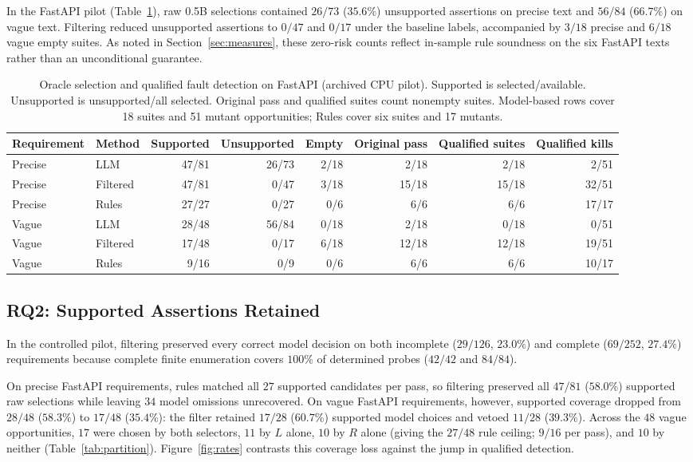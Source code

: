 \documentclass[sigconf,nonacm]{acmart}
\begin{document}
In the FastAPI pilot (Table~\ref{tab:api}), raw 0.5B selections contained $26/73$ ($35.6\%$) unsupported assertions on precise text and $56/84$ ($66.7\%$) on vague text. Filtering reduced unsupported assertions to $0/47$ and $0/17$ under the baseline labels, accompanied by $3/18$ precise and $6/18$ vague empty suites. As noted in Section~\ref{sec:measures}, these zero-risk counts reflect in-sample rule soundness on the six FastAPI texts rather than an unconditional guarantee.

\begin{table}[t]
\caption{Oracle selection and qualified fault detection on FastAPI (archived CPU pilot). Supported is selected/available. Unsupported is unsupported/all selected. Original pass and qualified suites count nonempty suites. Model-based rows cover 18 suites and 51 mutant opportunities; Rules cover six suites and 17 mutants.}
\label{tab:api}
\centering\small
\begin{tabular}{llrrrrrr}
\toprule
Requirement & Method & Supported & Unsupported & Empty & Original pass & Qualified suites & Qualified kills\\
\midrule
Precise & LLM & 47/81 & 26/73 & 2/18 & 2/18 & 2/18 & 2/51\\
Precise & Filtered & 47/81 & 0/47 & 3/18 & 15/18 & 15/18 & 32/51\\
Precise & Rules & 27/27 & 0/27 & 0/6 & 6/6 & 6/6 & 17/17\\
\midrule
Vague & LLM & 28/48 & 56/84 & 0/18 & 2/18 & 0/18 & 0/51\\
Vague & Filtered & 17/48 & 0/17 & 6/18 & 12/18 & 12/18 & 19/51\\
Vague & Rules & 9/16 & 0/9 & 0/6 & 6/6 & 6/6 & 10/17\\
\bottomrule
\end{tabular}
\end{table}

\subsection{RQ2: Supported Assertions Retained}
In the controlled pilot, filtering preserved every correct model decision on both incomplete ($29/126$, $23.0\%$) and complete ($69/252$, $27.4\%$) requirements because complete finite enumeration covers $100\%$ of determined probes ($42/42$ and $84/84$).

On precise FastAPI requirements, rules matched all $27$ supported candidates per pass, so filtering preserved all $47/81$ ($58.0\%$) supported raw selections while leaving $34$ model omissions unrecovered. On vague FastAPI requirements, however, supported coverage dropped from $28/48$ ($58.3\%$) to $17/48$ ($35.4\%$): the filter retained $17/28$ ($60.7\%$) supported model choices and vetoed $11/28$ ($39.3\%$). Across the $48$ vague opportunities, $17$ were chosen by both selectors, $11$ by $L$ alone, $10$ by $R$ alone (giving the $27/48$ rule ceiling; $9/16$ per pass), and $10$ by neither (Table~\ref{tab:partition}). Figure~\ref{fig:rates} contrasts this coverage loss against the jump in qualified detection.
\end{document}
